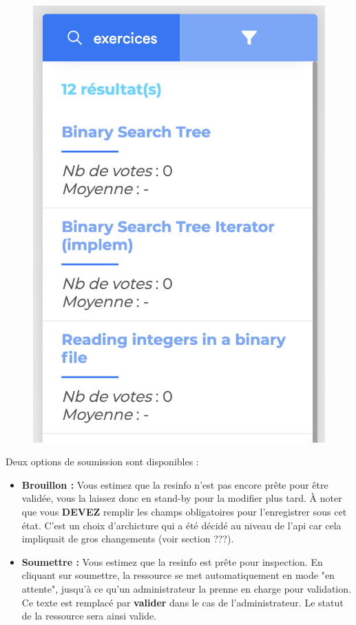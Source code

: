 \begin{figure}[H]
    \includegraphics[width=\textwidth,height=0.3\textheight,keepaspectratio]{images/client/similarity.png}
\end{figure}


Deux options de soumission sont disponibles :

\begin{itemize}
    \item \textbf{Brouillon :} Vous estimez que la \gls{resinfo} n'est pas encore prête pour être validée, vous la laissez donc en stand-by pour la modifier plus tard. À noter que vous \textbf{DEVEZ} remplir les champs obligatoires pour l'enregistrer sous cet état. C'est un choix d'archicture qui a été décidé au niveau de l'api car cela impliquait de gros changements (voir section ???).
    \item \textbf{Soumettre :} Vous estimez que la \gls{resinfo} est prête pour inspection. En cliquant sur soumettre, la ressource se met automatiquement en mode "en attente", jusqu'à ce qu'un administrateur la prenne en charge pour validation. Ce texte est remplacé par \textbf{valider} dans le cas de l'administrateur. Le statut de la ressource sera ainsi valide.
\end{itemize}

